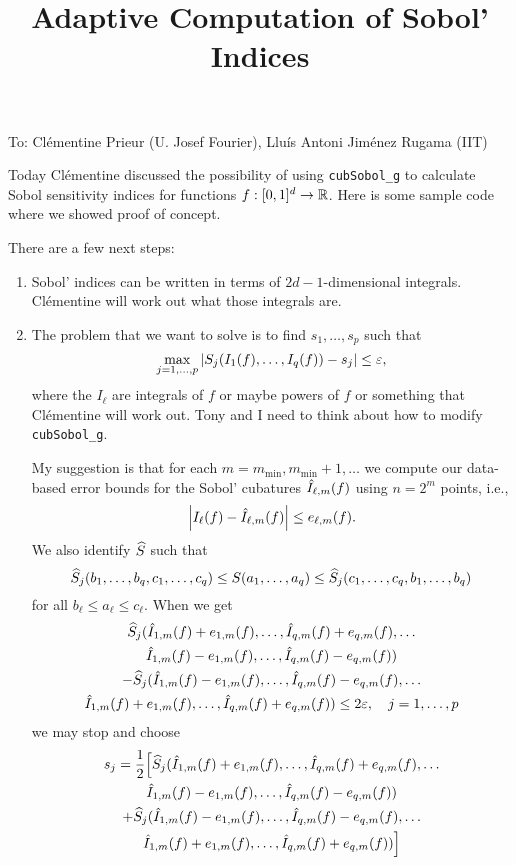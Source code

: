 \documentclass[]{amsart}
\newcommand{\oerr}{e}
\begin{document}
\title{Adaptive Computation of Sobol' Indices}
\maketitle

\noindent To:  Cl\'ementine Prieur (U. Josef Fourier), Llu\'is Antoni Jim\'enez Rugama (IIT)

\bigskip

Today Cl\'ementine discussed the possibility of using \texttt{cubSobol\_g} to calculate Sobol sensitivity indices for functions $f : [0,1]^d \to \mathbb{R}$.  Here is some sample code where we showed proof of concept.

%

There are a few next steps: 

\begin{enumerate}
\item Sobol' indices can be written in terms of $2d-1$-dimensional integrals.   Cl\'ementine will work out what those integrals are.

\item The problem that we want to solve is to find $s_1, \ldots, s_p$ such that 
\[
\max_{j=1, \ldots, p} \left \lvert S_j(I_1(f), \ldots, I_q(f)) - s_j \right \rvert \le \varepsilon,
\]
 where the $I_\ell$ are integrals of $f$ or maybe powers of $f$ or something that Cl\'ementine will work out.  Tony and I need to think about how to modify \texttt{cubSobol\_g}.
 
My suggestion is that for each $m = m_{\min}, m_{\min}+1, \ldots$ we compute our data-based error bounds for the Sobol' cubatures $\hat{I}_{\ell,m}(f)$ using $n=2^m$ points, i.e., 
\[
\abs{I_\ell(f) - \hI_{\ell,m}(f)} \le \oerr_{\ell,m}(f).
\]
We also identify $\widehat{S}$ such that 
\[
\widehat{S}_j(b_1, \ldots, b_q, c_1, \ldots, c_q) \le S(a_1, \ldots, a_q) \le \widehat{S}_j(c_1, \ldots, c_q, b_1, \ldots, b_q) 
\]
for all $b_\ell \le a_\ell \le c_\ell$.  When we get 
\begin{multline}\label{stopping_crit}
\hS_j(\hI_{1,m}(f) + \oerr_{1,m}(f), \ldots,\hI_{q,m}(f) + \oerr_{q,m}(f), \ldots \\
\hI_{1,m}(f) - \oerr_{1,m}(f), \ldots,\hI_{q,m}(f) - \oerr_{q,m}(f)) \\
 - \hS_j(\hI_{1,m}(f) - \oerr_{1,m}(f), \ldots,\hI_{q,m}(f) - \oerr_{q,m}(f), \ldots \\
 \hI_{1,m}(f) + \oerr_{1,m}(f), \ldots,\hI_{q,m}(f) + \oerr_{q,m}(f))   \le 2\varepsilon, \quad j = 1, \ldots, p
\end{multline}
we may stop and choose 
\begin{multline*}
s_j = \frac{1}{2}\Bigl[\hS_j(\hI_{1,m}(f) + \oerr_{1,m}(f), \ldots,\hI_{q,m}(f) + \oerr_{q,m}(f), \ldots \\
\hI_{1,m}(f) - \oerr_{1,m}(f), \ldots,\hI_{q,m}(f) - \oerr_{q,m}(f)) \\
+ \hS_j(\hI_{1,m}(f) - \oerr_{1,m}(f), \ldots,\hI_{q,m}(f) - \oerr_{q,m}(f), \ldots \\
 \hI_{1,m}(f) + \oerr_{1,m}(f), \ldots,\hI_{q,m}(f) + \oerr_{q,m}(f)) \Bigr]
 \end{multline*}
 

\end{enumerate}
\end{document}
